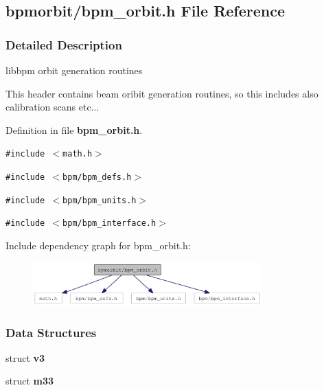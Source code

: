 \subsection{bpmorbit/bpm\_\-orbit.h File Reference}
\label{bpm__orbit_8h}


\subsubsection{Detailed Description}
libbpm orbit generation routines 

This header contains beam oribit generation routines, so this includes also calibration scans etc... 

Definition in file {\bf bpm\_\-orbit.h}.

{\tt \#include $<$math.h$>$}\par
{\tt \#include $<$bpm/bpm\_\-defs.h$>$}\par
{\tt \#include $<$bpm/bpm\_\-units.h$>$}\par
{\tt \#include $<$bpm/bpm\_\-interface.h$>$}\par


Include dependency graph for bpm\_\-orbit.h:\nopagebreak
\begin{figure}[H]
\begin{center}
\leavevmode
\includegraphics[width=250pt]{bpm__orbit_8h__incl}
\end{center}
\end{figure}
\subsubsection*{Data Structures}
\begin{CompactItemize}
\item 
struct {\bf v3}
\item 
struct {\bf m33}
\end{CompactItemize}
